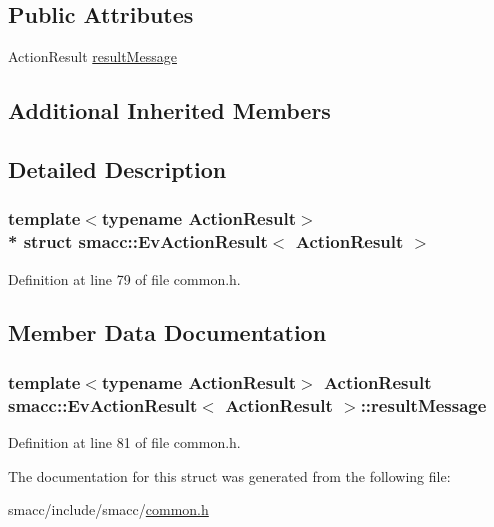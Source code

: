 \subsection*{Public Attributes}
\begin{DoxyCompactItemize}
\item 
Action\+Result \hyperlink{structsmacc_1_1EvActionResult_a769d1218e33213f72adc1eb72dd02e46}{result\+Message}
\end{DoxyCompactItemize}
\subsection*{Additional Inherited Members}


\subsection{Detailed Description}
\subsubsection*{template$<$typename Action\+Result$>$\\*
struct smacc\+::\+Ev\+Action\+Result$<$ Action\+Result $>$}



Definition at line 79 of file common.\+h.



\subsection{Member Data Documentation}
\subsubsection[{\texorpdfstring{result\+Message}{resultMessage}}]{\setlength{\rightskip}{0pt plus 5cm}template$<$typename Action\+Result$>$ Action\+Result {\bf smacc\+::\+Ev\+Action\+Result}$<$ Action\+Result $>$\+::result\+Message}\hypertarget{structsmacc_1_1EvActionResult_a769d1218e33213f72adc1eb72dd02e46}{}\label{structsmacc_1_1EvActionResult_a769d1218e33213f72adc1eb72dd02e46}


Definition at line 81 of file common.\+h.



The documentation for this struct was generated from the following file\+:\begin{DoxyCompactItemize}
\item 
smacc/include/smacc/\hyperlink{common_8h}{common.\+h}\end{DoxyCompactItemize}
